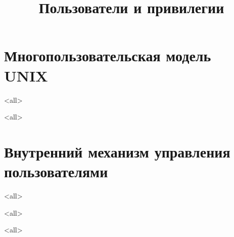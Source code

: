 
\title{Пользователи и привилегии}




\newcommand{\defaultuser}{\$USER}



\begin{frame}
	\frametitle{}
	\titlepage
	\vspace{-0.5cm}
	\begin{center}
	\end{center}
\end{frame}
\section{Многопользовательская модель UNIX}
\mode<all>{}

\mode<all>{}
\section{Внутренний механизм управления пользователями}
\mode<all>{}

\mode<all>{}

\mode<all>

